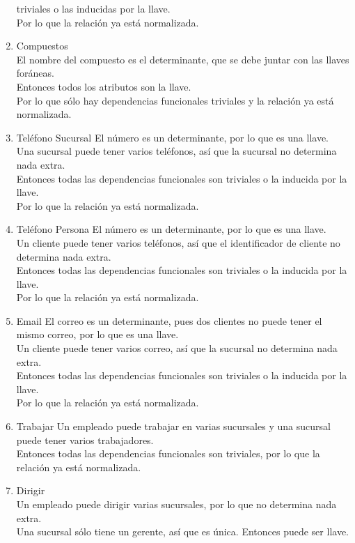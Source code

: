 \documentclass[10pt]{article}
\begin{document}
\begin{enumerate}
	triviales o las inducidas por la llave.\\
	Por lo que la relación ya está normalizada.
	\item Compuestos \\
	El nombre del compuesto es el determinante, que se debe juntar con las
	llaves foráneas.\\
	Entonces  todos los atributos son la llave.\\
	Por lo que sólo hay dependencias funcionales triviales y la relación ya está
	normalizada.
	\item Teléfono Sucursal
	El número es un determinante, por lo que es una llave.\\
	Una sucursal puede tener varios teléfonos, así que la sucursal no determina
	nada extra.\\
	Entonces todas las dependencias funcionales son triviales o la inducida por
	la llave.\\
	Por lo que la relación ya está normalizada.
	\item Teléfono Persona
	El número es un determinante, por lo que es una llave.\\
	Un cliente puede tener varios teléfonos, así que el identificador de cliente
	no determina nada extra.\\
	Entonces todas las dependencias funcionales son triviales o la inducida por
	la llave.\\
	Por lo que la relación ya está normalizada.
	\item Email
	El correo es un determinante, pues dos clientes no puede tener el mismo
	correo, por lo que es una llave.\\
	Un cliente puede tener varios correo, así que la sucursal no determina
	nada extra.\\
	Entonces todas las dependencias funcionales son triviales o la inducida por
	la llave.\\
	Por lo que la relación ya está normalizada.
	\item Trabajar
	Un empleado puede trabajar en varias sucursales y una sucursal puede tener
	varios trabajadores. \\
	Entonces todas las dependencias funcionales son triviales, por lo que la
	relación ya está normalizada.
	\item Dirigir \\
	Un empleado puede dirigir varias sucursales, por lo que no determina nada
	extra.\\
	Una sucursal sólo tiene un gerente, así que es única. Entonces puede ser
	llave.\\

\end{enumerate}
\end{document}

